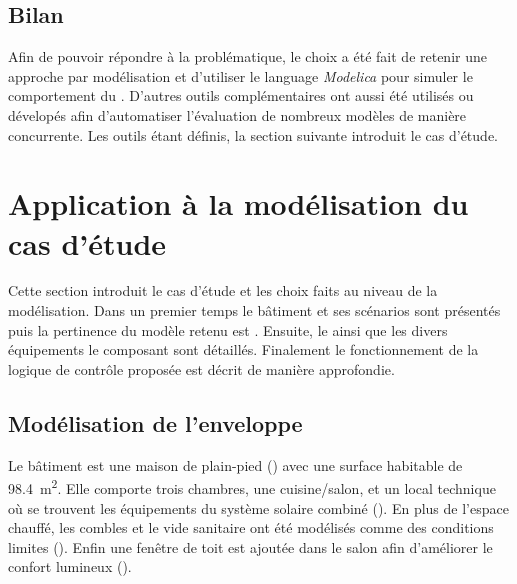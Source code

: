 \subsection{Bilan} %
\label{sub:bilan_choix_modelisation}
Afin de pouvoir répondre à la problématique, le choix a été fait de retenir une approche
par modélisation et d’utiliser le language \textit{Modelica} pour simuler le comportement
du . D’autres outils complémentaires ont aussi été utilisés ou dévelopés afin
d’automatiser l’évaluation de nombreux modèles de manière concurrente. Les outils étant
définis, la section suivante introduit le cas d’étude.


\section{Application à la modélisation du cas d’étude} %
\label{sec:application_a_la_modelisation_du_cas_d_etude}
Cette section introduit le cas d’étude et les choix faits au niveau de la modélisation.
Dans un premier temps le bâtiment et ses scénarios sont présentés puis la pertinence
du modèle retenu est . Ensuite, le  ainsi que les divers équipements le
composant sont détaillés. Finalement le fonctionnement de la logique de contrôle proposée
est décrit de manière approfondie.


\subsection{Modélisation de l’enveloppe} %
\label{sub:modelisation_de_l_enveloppe}
Le bâtiment est une maison de plain-pied () avec une surface habitable
de \SI{98.4}{\meter\squared}. Elle comporte trois chambres, une cuisine/salon, et un local
technique où se trouvent les équipements du système solaire combiné (). En plus de
l’espace chauffé, les combles et le vide sanitaire ont été modélisés comme des conditions
limites (). Enfin une fenêtre de toit est ajoutée dans
le salon afin d’améliorer le confort lumineux ().

